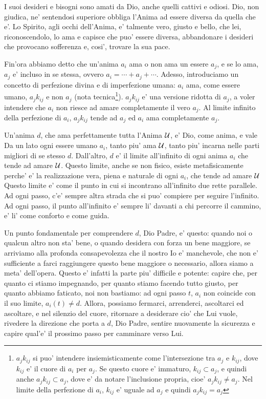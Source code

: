I suoi desideri e bisogni sono amati da Dio, anche quelli cattivi e odiosi. Dio, non giudica, ne' sentendosi superiore obbliga l'Anima ad essere diversa da quella che e'. Lo Spirito, agli occhi dell'Anima, e' talmente vero, giusto e bello, che lei, riconoscendolo, lo ama e capisce che puo' essere diversa, abbandonare i desideri che provocano sofferenza e, cosi', trovare la sua pace.

Fin'ora abbiamo detto che un'anima $a_i$ ama o non ama un essere $a_j$, e se lo ama, $a_j$ e' incluso in se stessa, ovvero $a_i=\cdots+a_j+\cdots$. Adesso, introduciamo un concetto di perfezione divina e di imperfezione umana: $a_i$ ama, come essere umano, $a_jk_{ij}$ e non $a_j$ (nota tecnica\footnote{$a_jk_{ij}$ si puo' intendere insiemisticamente come l'intersezione tra $a_j$ e $k_{ij}$, dove $k_{ij}$ e' il cuore di $a_i$ per $a_j$. Se questo cuore e' immaturo, $k_{ij} \subset a_j$, e quindi anche $a_jk_{ij}\subset a_j$, dove e' da notare l'inclusione propria, cioe' $a_jk_{ij}\ne a_j$. Nel limite della perfezione di $a_i$, $k_{ij}$ e' uguale ad $a_j$ e quindi $a_jk_{ij}=a_j$}). $a_jk_{ij}$ e' una versione ridotta di $a_j$, a voler intendere che $a_i$ non riesce ad amare completamente il vero $a_j$. Al limite infinito della perfezione di $a_i$, $a_jk_{ij}$ tende ad $a_j$ ed $a_i$ ama completamente $a_j$.

Un'anima $d$, che ama perfettamente tutta l'Anima $\mathcal{U}$, e' Dio, come anima, e vale 
Da un lato ogni essere umano $a_i$, tanto piu' ama $\mathcal{U}$, tanto piu' incarna nelle parti migliori di se stesso $d$. Dall'altro, $d$ e' il limite all'infinito di ogni anima $a_i$ che tende ad amare $\mathcal{U}$. Questo limite, anche se non fisico, esiste metafisicamente perche' e' la realizzazione vera, piena e naturale di ogni $a_i$, che tende ad amare $\mathcal{U}$
Questo limite e' come il punto in cui si incontrano all'infinito due rette parallele. Ad ogni passo, c'e' sempre altra strada che si puo' compiere per seguire l'infinito. Ad ogni passo, il punto all'infinito e' sempre li' davanti a chi percorre il cammino, e' li' come conforto e come guida.

Un punto fondamentale per comprendere $d$, Dio Padre, e' questo: quando noi o qualcun altro non sta' bene, o quando desidera con forza un bene maggiore, se arriviamo alla profonda consapevolezza che il nostro Io e' manchevole, che non e' sufficiente a farci raggiungere questo bene maggiore o necessario, allora siamo a meta' dell'opera. Questo e' infatti la parte piu' difficile e potente: capire che, per quanto ci stiamo impegnando, per quanto stiamo facendo tutto giusto, per quanto abbiamo faticato, noi non bastiamo: ad ogni passo $t$, $a_i$ non coincide con il suo limite, $a_i(t) \ne d$. Allora, possiamo fermarci, arrenderci, ascoltarci ed ascoltare, e nel silenzio del cuore, ritornare a desiderare cio' che Lui vuole, rivedere la direzione che porta a $d$, Dio Padre, sentire nuovamente la sicurezza e capire qual'e' il prossimo passo per camminare verso Lui.

